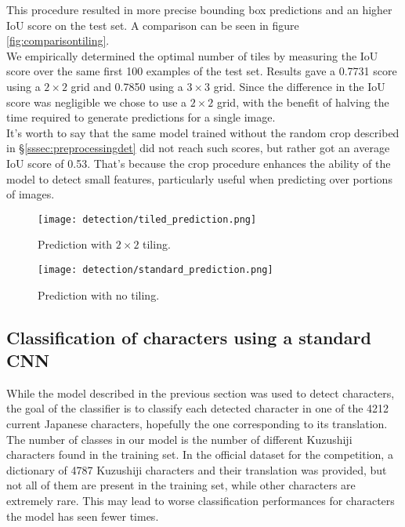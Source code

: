 This procedure resulted in more precise bounding box predictions and an higher IoU score on the test set. A comparison can be seen in figure \ref{fig:comparisontiling}. \\
We empirically determined the optimal number of tiles by measuring the IoU score over the same first 100 examples of the test set. Results gave a 0.7731 score using a $2 \times 2$ grid and 0.7850 using a $3 \times 3$ grid. 
Since the difference in the IoU score was negligible we chose to use a $2 \times 2$ grid, with the benefit of halving the time required to generate predictions for a single image.\\
It's worth to say that the same model trained without the random crop described in §\ref{sssec:preprocessingdet} did not reach such scores, but rather got an average IoU score of 0.53. That's because the crop procedure enhances the ability of the model to detect small features, particularly useful when predicting over portions of images.

\begin{figure*}[!htb]
	\centering
	\begin{subfigure}{\columnwidth}
		\centering
		\texttt{[image: detection/tiled\_prediction.png]}
		\caption{Prediction with $2\times2$ tiling.}
		\label{fig:tiledpred}
	\end{subfigure}
	\begin{subfigure}{\columnwidth}
		\centering
		\texttt{[image: detection/standard\_prediction.png]}
		\caption{Prediction with no tiling.}
		\label{fig:standardpred}
	\end{subfigure}
	\caption{Comparison of prediction on the same page with and without tiling. Image (\ref{fig:tiledpred}) got an IoU score of 0.83, while (\ref{fig:standardpred}) scored 0.59.}
	\label{fig:comparisontiling}
\end{figure*}

\subsection{Classification of characters using a standard CNN}
\label{ssec:classificationcnn}

While the model described in the previous section was used to detect characters, the goal of the classifier is to classify each detected character in one of the 4212 current Japanese characters, hopefully the one corresponding to its translation. The number of classes in our model is the number of different Kuzushiji characters found in the training set. In the official dataset for the competition, a dictionary of 4787 Kuzushiji characters and their translation was provided, but not all of them are present in the training set, while other characters are extremely rare. This may lead to worse classification performances for characters the model has seen fewer times.

